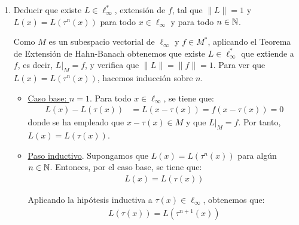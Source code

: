 \begin{ejercicio}
\begin{enumerate}
    Como $x \in \ell_\infty$, para todo $n \in \bb{N}$ se tiene que:
    \begin{align*}
        \left|f_n(x - \tau(x))\right| = \left|\dfrac{x(1) - x(n + 1)}{n}\right| \leq \dfrac{|x(1)| + |x(n + 1)|}{n} \leq \dfrac{2\|x\|_\infty}{n}
    \end{align*}

    Por tanto, tomando límite cuando $n \to \infty$, obtenemos que:
    \begin{align*}
        \lim_{n \to \infty} f_n(x - \tau(x)) = 0
    \end{align*}

    Por tanto, $x - \tau(x) \in M$ y $f(x - \tau(x)) = 0$; es decir, $x - \tau(x) \in \ker(f)$. Como $x \in \ell_\infty$ es arbitrario, obtenemos que $x - \tau(x) \in \ker(f) \subseteq M$ para todo $x \in \ell_\infty$.


    \item Deducir que existe $L \in \ell_\infty^*$, extensión de $f$, tal que $\|L\| = 1$ y $L(x) = L(\tau^n(x))$ para todo $x \in \ell_\infty$ y para todo $n \in \bb{N}$.
    
    Como $M$ es un subespacio vectorial de $\ell_\infty$ y $f \in M^*$, aplicando el Teorema de Extensión de Hahn-Banach obtenemos que existe $L \in \ell_\infty^*$ que extiende a $f$, es decir, $L|_M = f$, y verifica que $\|L\| = \|f\| = 1$. Para ver que $L(x) = L(\tau^n(x))$, hacemos inducción sobre $n$.
    \begin{itemize}
        \item \ul{Caso base: $n = 1$}. Para todo $x \in \ell_\infty$, se tiene que:
        \begin{align*}
            L(x) - L(\tau(x)) &= L(x - \tau(x)) = f(x - \tau(x)) = 0
        \end{align*}
        donde se ha empleado que $x - \tau(x) \in M$ y que $L|_M = f$. Por tanto, $L(x) = L(\tau(x))$.
        \item \ul{Paso inductivo}. Supongamos que $L(x) = L(\tau^n(x))$ para algún $n \in \bb{N}$. Entonces, por el caso base, se tiene que:
        \begin{align*}
            L(x) = L(\tau(x))
        \end{align*}

        Aplicando la hipótesis inductiva a $\tau(x)\in \ell_\infty$, obtenemos que:
        \begin{align*}
            L(\tau(x)) = L(\tau^{n + 1}(x))
        \end{align*}


\end{itemize}
\end{enumerate}
\end{ejercicio}

